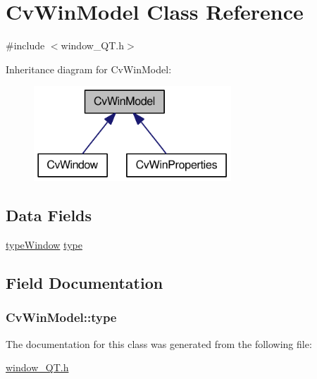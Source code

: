 \hypertarget{classCvWinModel}{
\section{CvWinModel Class Reference}
\label{classCvWinModel}
}


{\ttfamily \#include $<$window\_\-QT.h$>$}



Inheritance diagram for CvWinModel:\nopagebreak
\begin{figure}[H]
\begin{center}
\leavevmode
\includegraphics[width=210pt]{classCvWinModel__inherit__graph}
\end{center}
\end{figure}
\subsection*{Data Fields}
\begin{DoxyCompactItemize}
\item 
\hyperlink{window__QT_8h_a3ce3f41fe742c83e94d4cd007e7b4c70}{typeWindow} \hyperlink{classCvWinModel_a6b9598fed3bff14f0c10ec85a20ed83e}{type}
\end{DoxyCompactItemize}


\subsection{Field Documentation}
\hypertarget{classCvWinModel_a6b9598fed3bff14f0c10ec85a20ed83e}{
\subsubsection[{type}]{ {\bf CvWinModel::type}}}
\label{classCvWinModel_a6b9598fed3bff14f0c10ec85a20ed83e}


The documentation for this class was generated from the following file:\begin{DoxyCompactItemize}
\item 
\hyperlink{window__QT_8h}{window\_\-QT.h}\end{DoxyCompactItemize}
